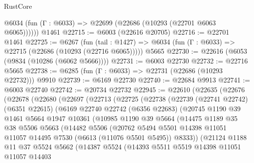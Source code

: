 \begin{lexlean}{RustCore}
\begin{coremodule}
      @6034 (fun (Γ : @6033) => @22699 (@22686 (@10293 (@22701 @6063 @6065))))))
    @1461
@22715 := @6003 (@22616 @20705)
@22716 := @22701 @1461
@22725 := @6267
    (fun (tail : @1427) => @6034 (fun (Γ : @6033) => @22715 (@22686 (@10293 (@22716 @6065)))))
    @5665
@22730 := @22616 (@6053 (@9834 (@10286 (@6062 @5666))))
@22731 := @6003 @22730
@22732 := @22716 @5665
@22738 := @6285 (fun (Γ : @6033) => @22731 (@22686 (@10293 @22732))) @9910
@22739 := @6169 @22730
@22740 := @22684 @9913
@22741 := @6003 @22740
@22742 := @20734 @22732
@22945 := @22610
    (@22635
      (@22676
        (@22678
          (@22680
            (@22697
              (@22713
                (@22725
                  (@22738
                    (@22739
                      (@22741 @22742)
                      (@6351 @22615)
                      (@6169
                        @22740
                        @22742
                        (@6356 @22683)
                        (@20745
                          @1190
                          @39
                          @1461
                          @5664
                          @1947
                          @10361
                          (@10985
                            @1190
                            @39
                            @5664
                            (@14475
                              @1189
                              @35
                              @38
                              @5506
                              @5663
                              (@14482
                                @5506
                                (@20762
                                  @5494
                                  @5501
                                  @14398
                                  @11051
                                  @11057
                                  @14495
                                  @7530
                                  (@6613 (@11076 @5501 @5495))
                                  @8333))
                              (@21124
                                @1188
                                @11
                                @37
                                @5524
                                @5662
                                (@14387
                                  @5524
                                  (@14393
                                    @5511
                                    @5519
                                    @14398
                                    @11051
                                    @11057
                                    @14403

\end{coremodule}
\end{lexlean}
